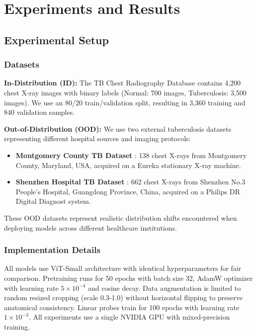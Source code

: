 \documentclass[11pt,a4paper]{article}
\begin{document}
\section{Experiments and Results}

\subsection{Experimental Setup}

\subsubsection{Datasets}

\textbf{In-Distribution (ID):} The TB Chest Radiography Database \citep{rahman2020reliable} contains 4,200 chest X-ray images with binary labels (Normal: 700 images, Tuberculosis: 3,500 images). We use an 80/20 train/validation split, resulting in 3,360 training and 840 validation samples.

\textbf{Out-of-Distribution (OOD):} We use two external tuberculosis datasets representing different hospital sources and imaging protocols:
\begin{itemize}[leftmargin=*]
    \item \textbf{Montgomery County TB Dataset} \citep{jaeger2014two}: 138 chest X-rays from Montgomery County, Maryland, USA, acquired on a Eureka stationary X-ray machine.
    \item \textbf{Shenzhen Hospital TB Dataset} \citep{jaeger2014two}: 662 chest X-rays from Shenzhen No.3 People's Hospital, Guangdong Province, China, acquired on a Philips DR Digital Diagnost system.
\end{itemize}

These OOD datasets represent realistic distribution shifts encountered when deploying models across different healthcare institutions.

\subsubsection{Implementation Details}

All models use ViT-Small architecture with identical hyperparameters for fair comparison. Pretraining runs for 50 epochs with batch size 32, AdamW optimizer with learning rate $5 \times 10^{-4}$ and cosine decay. Data augmentation is limited to random resized cropping (scale 0.3-1.0) without horizontal flipping to preserve anatomical consistency. Linear probes train for 100 epochs with learning rate $1 \times 10^{-3}$. All experiments use a single NVIDIA GPU with mixed-precision training.
\end{document}
